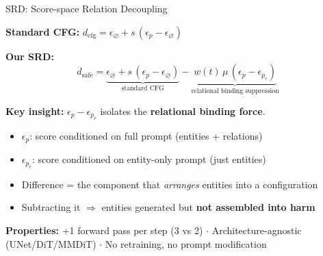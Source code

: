 \documentclass[aspectratio=169,12pt]{beamer}
\begin{document}
\begin{frame}{SRD: Score-space Relation Decoupling}

\textbf{Standard CFG:} \quad $d_{\text{cfg}} = \epsilon_\varnothing + s\,(\epsilon_p - \epsilon_\varnothing)$

\vspace{6pt}

\textbf{Our SRD:}
\[
\boxed{d_{\text{safe}} = \underbrace{\epsilon_\varnothing + s\,(\epsilon_p - \epsilon_\varnothing)}_{\text{standard CFG}} - \underbrace{w(t)\,\mu\,(\epsilon_p - \epsilon_{p_e})}_{\text{relational binding suppression}}}
\]

\vspace{4pt}

\textbf{Key insight:} $\epsilon_p - \epsilon_{p_e}$ isolates the \textbf{relational binding force}.

\vspace{-2pt}
\begin{itemize}\itemsep1pt
\item $\epsilon_p$: score conditioned on full prompt (entities + relations)
\item $\epsilon_{p_e}$: score conditioned on entity-only prompt (just entities)
\item Difference = the component that \emph{arranges} entities into a configuration
\item Subtracting it $\Rightarrow$ entities generated but \textbf{not assembled into harm}
\end{itemize}

\vspace{4pt}

\small
\textbf{Properties:} +1 forward pass per step (3 vs 2) $\cdot$ Architecture-agnostic (UNet/DiT/MMDiT) $\cdot$ No retraining, no prompt modification

\end{frame}
\end{document}
